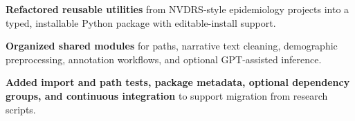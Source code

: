 \begin{bullets}
    \item \textbf{Refactored reusable utilities} from NVDRS-style epidemiology projects into a typed, installable Python package with editable-install support.
    \item \textbf{Organized shared modules} for paths, narrative text cleaning, demographic preprocessing, annotation workflows, and optional GPT-assisted inference.
    \item \textbf{Added import and path tests, package metadata, optional dependency groups, and continuous integration} to support migration from research scripts.
\end{bullets}